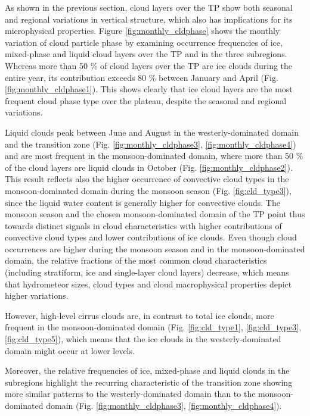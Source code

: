 \documentclass[alpha-refs]{wiley-article}
\begin{document}
As shown in the previous section, cloud layers over the TP show both seasonal and regional variations in vertical structure, which also has implications for its microphysical properties. Figure \ref{fig:monthly_cldphase} shows the monthly variation of cloud particle phase by examining occurrence frequencies of ice, mixed-phase and liquid cloud layers over the TP and in the three subregions. Whereas more than 50 \% of cloud layers over the TP are ice clouds during the entire year, its contribution exceeds 80 \% between January and April (Fig. \ref{fig:monthly_cldphase1}). This shows clearly that ice cloud layers are the most frequent cloud phase type over the plateau, despite the seasonal and regional variations. 

Liquid clouds peak between June and August in the westerly-dominated domain and the transition zone (Fig. \ref{fig:monthly_cldphase3}, \ref{fig:monthly_cldphase4}) and are most frequent in the monsoon-dominated domain, where more than 50 \% of the cloud layers are liquid clouds in October (Fig. \ref{fig:monthly_cldphase2}). This result reflects also the higher occurrence of convective cloud types in the monsoon-dominated domain during the monsoon season (Fig. \ref{fig:cld_type3}), since the liquid water content is generally higher for convective clouds. The monsoon season and the chosen monsoon-dominated domain of the TP point thus towards distinct signals in cloud characteristics with higher contributions of convective cloud types and lower contributions of ice clouds. Even though cloud occurrences are higher during the monsoon season and in the monsoon-dominated domain, the relative fractions of the most common cloud characteristics (including stratiform, ice and single-layer cloud layers) decrease, which means that hydrometeor sizes, cloud types and cloud macrophysical properties depict higher variations. 

However, high-level cirrus clouds are, in contrast to total ice clouds, more frequent in the monsoon-dominated domain (Fig. \ref{fig:cld_type1}, \ref{fig:cld_type3}, \ref{fig:cld_type5}), which means that the ice clouds in the westerly-dominated domain might occur at lower levels.  

Moreover, the relative frequencies of ice, mixed-phase and liquid clouds in the subregions highlight the recurring characteristic of the transition zone showing more similar patterns to the westerly-dominated domain than to the monsoon-dominated domain (Fig. \ref{fig:monthly_cldphase3}, \ref{fig:monthly_cldphase4}).
\end{document}
